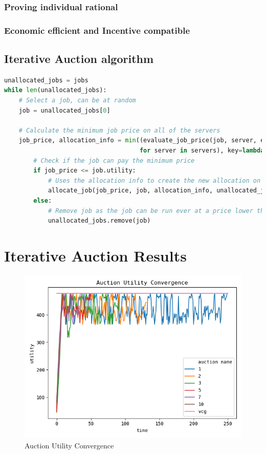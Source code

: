 \subsubsection{Proving individual rational}
\subsubsection{Economic efficient and Incentive compatible}

\subsection{Iterative Auction algorithm}\label{subsec:iterative-auction-algorithm}
\begin{lstlisting}[language=Python]
unallocated_jobs = jobs
while len(unallocated_jobs):
    # Select a job, can be at random
    job = unallocated_jobs[0]

    # Calculate the minimum job price on all of the servers
    job_price, allocation_info = min((evaluate_job_price(job, server, epsilon=epsilon)
                                     for server in servers), key=lambda bid: bid[0])
        # Check if the job can pay the minimum price
        if job_price <= job.utility:
            # Uses the allocation info to create the new allocation on the selected server
            allocate_job(job_price, job, allocation_info, unallocated_jobs)
        else:
            # Remove job as the job can be run ever at a price lower than the job's true utility
            unallocated_jobs.remove(job)
\end{lstlisting}

\section{Iterative Auction Results}\label{sec:auctions-results}
\begin{figure}[H]
    \centering
    \includegraphics[width=1\linewidth]{../results/auction_utility_convergence.png}
    \caption{Auction Utility Convergence}
\end{figure}


